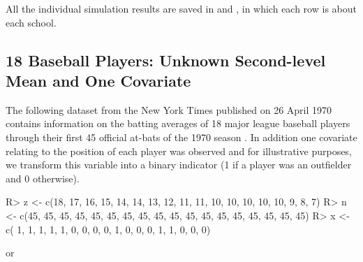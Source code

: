 \documentclass[article]{jss}
\begin{document}
All the individual simulation results are saved in  and , in which each row is about each school.





\subsection[Unknown Second-level Mean and One Covariate]{18 Baseball Players: Unknown Second-level Mean and One Covariate}

The following dataset from the New York Times published on 26 April 1970 contains information on the batting averages of 18 major league baseball players through their first 45 official at-bats of the 1970 season \citep{1975}. In addition one covariate relating to the position of each player was observed and for illustrative purposes, we transform this variable into a binary indicator (1 if a player was an outfielder and 0 otherwise).
\begin{CodeChunk}
\begin{CodeInput}
R> z <- c(18, 17, 16, 15, 14, 14, 13, 12, 11, 11, 10, 10, 10, 10, 10,  9,  8,  7)
R> n <- c(45, 45, 45, 45, 45, 45, 45, 45, 45, 45, 45, 45, 45, 45, 45, 45, 45, 45)
R> x <- c( 1,  1,  1,  1,  1,  0,  0,  0,  0,  1,  0,  0,  0,  1,  1,  0,  0,  0) 
\end{CodeInput}
\end{CodeChunk}
or
\begin{CodeChunk}
\end{CodeChunk}
\end{document}

